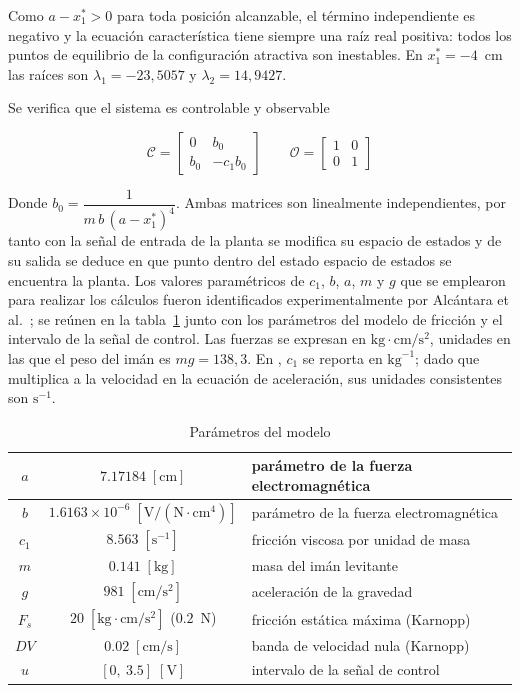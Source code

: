 Como $a - x_1^{\ast} > 0$ para toda posición alcanzable, el término independiente es negativo y la ecuación característica tiene siempre una raíz real positiva: todos los puntos de equilibrio de la configuración atractiva son inestables. En $x_1^{\ast}=-4$~cm las raíces son $\lambda_1 = -23{,}5057$ y $\lambda_2 = 14{,}9427$.

Se verifica que el sistema es controlable y observable

\[
\mathcal{C}
=
\begin{bmatrix}
0 & b_0\\[6pt]
b_0 & -c_1 b_0
\end{bmatrix}
\qquad
\mathcal{O}
=
\begin{bmatrix}
1 & 0\\[6pt]
0 & 1
\end{bmatrix}
\]

Donde $b_0 = \dfrac{1}{m\,b\,(a-x_1^{\ast})^4}$. Ambas matrices son linealmente independientes, por tanto con la señal de entrada de la planta se modifica su espacio de estados y de su salida se
deduce en que punto dentro del estado espacio de estados se encuentra la planta.
Los valores paramétricos de $c_1$, $b$, $a$, $m$ y $g$ que se emplearon para realizar los cálculos fueron identificados experimentalmente por Alcántara et al.\ \cite{diana_tesis}; se reúnen en la tabla~\ref{tab:parametros} junto con los parámetros del modelo de fricción y el intervalo de la señal de control. Las fuerzas se expresan en $\text{kg}\cdot\text{cm}/\text{s}^2$, unidades en las que el peso del imán es $mg = 138{,}3$. En \cite{diana_tesis}, $c_1$ se reporta en $\text{kg}^{-1}$; dado que multiplica a la velocidad en la ecuación de aceleración, sus unidades consistentes son $\text{s}^{-1}$.

\begin{table}[h]
\centering
\caption{Parámetros del modelo}
\label{tab:parametros}
\begin{tabular}{|c|c|l|}
\hline
$a$ & $7.17184\;[\text{cm}]$ & parámetro de la fuerza electromagnética \\ \hline
$b$ & $1.6163 \times 10^{-6}\;[\text{V}/(\text{N}\cdot\text{cm}^4)]$ & parámetro de la fuerza electromagnética \\ \hline
$c_1$ & $8.563\;[\text{s}^{-1}]$ & fricción viscosa por unidad de masa \\ \hline
$m$ & $0.141\;[\text{kg}]$ & masa del imán levitante \\ \hline
$g$ & $981\;[\text{cm}/\text{s}^2]$ & aceleración de la gravedad \\ \hline
$F_s$ & $20\;[\text{kg}\cdot\text{cm}/\text{s}^2]$ ($0.2$~N) & fricción estática máxima (Karnopp) \\ \hline
$DV$ & $0.02\;[\text{cm}/\text{s}]$ & banda de velocidad nula (Karnopp) \\ \hline
$u$ & $[0,\ 3.5]\;[\text{V}]$ & intervalo de la señal de control \\ \hline
\end{tabular}
\end{table}



